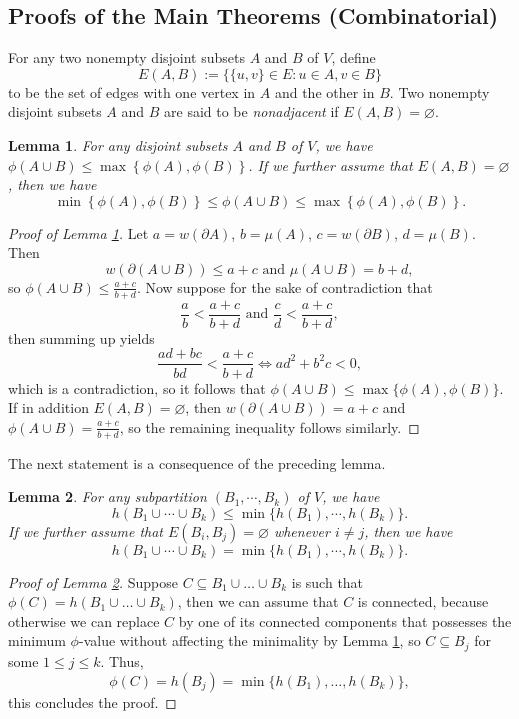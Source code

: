 \documentclass[12pt, reqno]{article}
\newtheorem{lemma}{Lemma}
\begin{document}
\subsection{Proofs of the Main Theorems (Combinatorial)}
For any two nonempty disjoint subsets $A$ and $B$ of $V$, define \[E(A,B):=\{\{u,v\}\in E:u\in A,v\in B\}\] to be the set of edges with one vertex in $A$ and the other in $B$. Two nonempty disjoint subsets $A$ and $B$ are said to be \emph{nonadjacent} if $E(A,B)=\varnothing$.

\begin{lemma}\label{lemma:basic-phi}
For any disjoint subsets $A$ and $B$ of $V$, we have $\phi(A\cup B)\le \max\left\{\phi(A),\phi(B)\right\}$. If we further assume that $E(A,B)=\varnothing$, then we have $$\min\left\{\phi(A),\phi(B)\right\} \le \phi(A\cup B)\le \max\left\{\phi(A),\phi(B)\right\}.$$
\end{lemma}

\begin{proof}[Proof of Lemma \ref{lemma:basic-phi}]
Let $a=w(\partial A)$, $b=\mu(A)$, $c=w(\partial B)$, $d=\mu(B)$. Then \[w(\partial(A\cup B))\le a+c\text{ and }\mu(A\cup B)=b+d,\] so $\phi(A\cup B)\le\frac{a+c}{b+d}$. Now suppose for the sake of contradiction that \[\frac ab<\frac{a+c}{b+d}\text{ and }\frac cd<\frac{a+c}{b+d},\] then summing up yields \[\frac{ad+bc}{bd}<\frac{a+c}{b+d}\iff ad^2+b^2c<0,\] which is a contradiction, so it follows that $\phi(A\cup B)\le\max\{\phi(A),\phi(B)\}$. If in addition $E(A,B)=\varnothing$, then $w(\partial(A\cup B))=a+c$ and $\phi(A\cup B)=\frac{a+c}{b+d}$, so the remaining inequality follows similarly.
\end{proof}

The next statement is a consequence of the preceding lemma.

\begin{lemma}\label{lem:cheeger-set-disjoint}
For any subpartition $(B_1,\cdots,B_k)$ of $V$, we have \[h(B_1\cup\cdots\cup B_k)\le \min\{h(B_1),\cdots,h(B_k)\}.\] If we further assume that $E(B_i,B_j)=\varnothing$ whenever $i\ne j$, then we have \[h(B_1\cup\cdots\cup B_k)=\min\{h(B_1),\cdots,h(B_k)\}.\]
\end{lemma}

\begin{proof}[Proof of Lemma \ref{lem:cheeger-set-disjoint}]
Suppose $C\subseteq B_1\cup\dots\cup B_k$ is such that $\phi(C)=h(B_1\cup\dots\cup B_k)$, then we can assume that $C$ is connected, because otherwise we can replace $C$ by one of its connected components that possesses the minimum $\phi$-value without affecting the minimality by Lemma \ref{lemma:basic-phi}, so $C\subseteq B_j$ for some $1\le j\le k$. Thus, \[\phi(C)=h(B_j)=\min\{h(B_1),\dots,h(B_k)\},\] this concludes the proof.
\end{proof}
\end{document}
